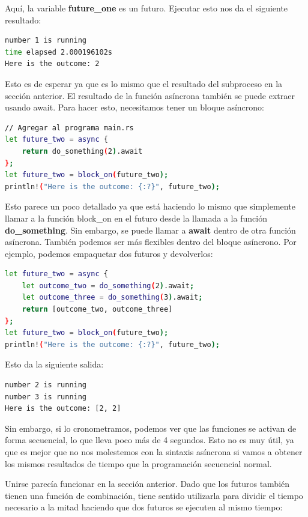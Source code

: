 Aquí, la variable \textbf{future\_one} es un futuro. Ejecutar esto nos da el siguiente resultado:

\begin{lstlisting}[language=bash]
number 1 is running
time elapsed 2.000196102s
Here is the outcome: 2
\end{lstlisting}

Esto es de esperar ya que es lo mismo que el resultado del subproceso en la sección anterior. El resultado de la función asíncrona también se puede extraer usando await. Para hacer esto, necesitamos tener un bloque asíncrono:

\begin{lstlisting}[language=bash]
// Agregar al programa main.rs
let future_two = async {
	return do_something(2).await
};    
let future_two = block_on(future_two);    
println!("Here is the outcome: {:?}", future_two);
\end{lstlisting}

Esto parece un poco detallado ya que está haciendo lo mismo que simplemente llamar a la función block\_on en el futuro desde la llamada a la función \textbf{do\_something}. Sin embargo, se puede llamar a \textbf{await} dentro de otra función asíncrona. También podemos ser más flexibles dentro del bloque asíncrono. Por ejemplo, podemos empaquetar dos futuros y devolverlos:

\begin{lstlisting}[language=bash]
let future_two = async {
	let outcome_two = do_something(2).await;  
	let outcome_three = do_something(3).await;
	return [outcome_two, outcome_three]    
};
let future_two = block_on(future_two);    
println!("Here is the outcome: {:?}", future_two);
\end{lstlisting}

Esto da la siguiente salida:

\begin{lstlisting}[language=bash]
number 2 is running
number 3 is running
Here is the outcome: [2, 2]
\end{lstlisting}

Sin embargo, si lo cronometramos, podemos ver que las funciones se activan de forma secuencial, lo que lleva poco más de 4 segundos. Esto no es muy útil, ya que es mejor que no nos molestemos con la sintaxis asíncrona si vamos a obtener los mismos resultados de tiempo que la programación secuencial normal.

Unirse parecía funcionar en la sección anterior. Dado que los futuros también tienen una función de combinación, tiene sentido utilizarla para dividir el tiempo necesario a la mitad haciendo que dos futuros se ejecuten al mismo tiempo:

